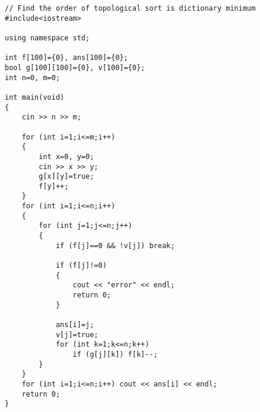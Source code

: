 \documentclass[a4paper]{article}
\begin{document}
\begin{verbatim}
// Find the order of topological sort is dictionary minimum
#include<iostream>

using namespace std;

int f[100]={0}, ans[100]={0};
bool g[100][100]={0}, v[100]={0};
int n=0, m=0;

int main(void)
{
	cin >> n >> m;

	for (int i=1;i<=m;i++)
	{
		int x=0, y=0;
		cin >> x >> y;
		g[x][y]=true;
		f[y]++;
	}
	for (int i=1;i<=n;i++)
	{
		for (int j=1;j<=n;j++)
		{
			if (f[j]==0 && !v[j]) break;

			if (f[j]!=0)
			{
				cout << "error" << endl;
				return 0;
			}

			ans[i]=j;
			v[j]=true;
			for (int k=1;k<=n;k++)
				if (g[j][k]) f[k]--;
		}
	}
	for (int i=1;i<=n;i++) cout << ans[i] << endl;
	return 0;
}
\end{verbatim}
\end{document}
